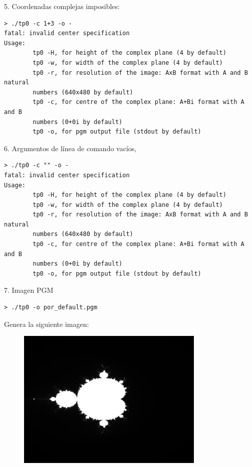 \documentclass[a4paper,10pt]{article}
\begin{document}
5. Coordenadas complejas imposibles:
\begin{verbatim}
> ./tp0 -c 1+3 -o -
fatal: invalid center specification
Usage:
		tp0 -H, for height of the complex plane (4 by default)
		tp0 -w, for width of the complex plane (4 by default)
		tp0 -r, for resolution of the image: AxB format with A and B natural
		numbers (640x480 by default)
		tp0 -c, for centre of the complex plane: A+Bi format with A and B
		numbers (0+0i by default)
		tp0 -o, for pgm output file (stdout by default)
\end{verbatim}


6. Argumentos de l\'inea de comando vac\'ios,
\begin{verbatim}
> ./tp0 -c "" -o -
fatal: invalid center specification
Usage:
		tp0 -H, for height of the complex plane (4 by default)
		tp0 -w, for width of the complex plane (4 by default)
		tp0 -r, for resolution of the image: AxB format with A and B natural
		numbers (640x480 by default)
		tp0 -c, for centre of the complex plane: A+Bi format with A and B
		numbers (0+0i by default)
		tp0 -o, for pgm output file (stdout by default)
\end{verbatim}


7. Imagen PGM
\begin{verbatim}
> ./tp0 -o por_default.pgm
\end{verbatim}
Genera la siguiente imagen:
\begin{figure}
\begin{center}
\includegraphics[width=0.8\textwidth]{./por_default.png}
\label{fig:Region barrida por defecto}
\caption{}
\end{center}
\end{figure}
\end{document}
